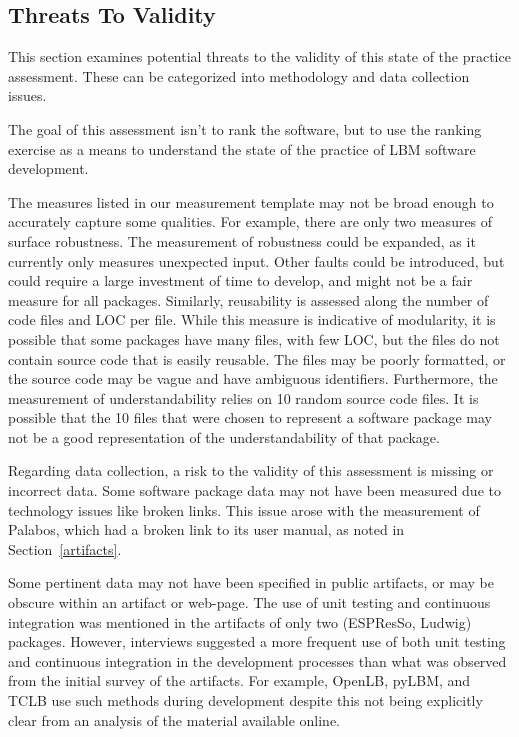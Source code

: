 \documentclass[final, 3p, times, authoryear]{elsarticle}
\begin{document}
\subsection{Threats To Validity} \label{threats}

This section examines potential threats to the validity of this state of the
practice assessment. These can be categorized into methodology and data
collection issues. 

The goal of this assessment isn't to rank the software, but to use the ranking
exercise as a means to understand the state of the practice of LBM software
development.

The measures listed in our measurement template may not be broad enough to
accurately capture some qualities. For example, there are only two measures of
surface robustness. The measurement of robustness could be expanded, as it
currently only measures unexpected input. Other faults could be introduced, but
could require a large investment of time to develop, and might not be a fair
measure for all packages. Similarly, reusability is assessed along the number of
code files and LOC per file. While this measure is indicative of modularity, it
is possible that some packages have many files, with few LOC, but the files do
not contain source code that is easily reusable. The files may be poorly
formatted, or the source code may be vague and have ambiguous identifiers.
Furthermore, the measurement of understandability relies on 10 random source
code files. It is possible that the 10 files that were chosen to represent a
software package may not be a good representation of the understandability of
that package.

Regarding data collection, a risk to the validity of this assessment is missing
or incorrect data. Some software package data may not have been measured due to
technology issues like broken links. This issue arose with the measurement of
Palabos, which had a broken link to its user manual, as noted in
Section~\ref{artifacts}. 

Some pertinent data may not have been specified in public artifacts, or may be
obscure within an artifact or web-page. The use of unit testing and continuous
integration was mentioned in the artifacts of only two (ESPResSo, Ludwig)
packages. However, interviews suggested a more frequent use of both unit testing
and continuous integration in the development processes than what was observed
from the initial survey of the artifacts. For example, OpenLB, pyLBM, and TCLB
use such methods during development despite this not being explicitly clear from
an analysis of the material available online. 
\end{document}
